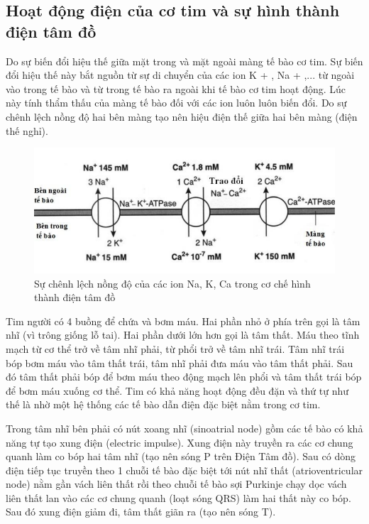 \subsection{Hoạt động điện của cơ tim và sự hình thành điện tâm đồ}
Do sự biến đổi hiệu thế giữa mặt trong và mặt ngoài màng tế bào cơ tim. Sự biến đổi hiệu thế này bắt nguồn từ sự di chuyển của các ion K + , Na + ,... từ ngoài vào trong tế bào và từ trong tế bào ra ngoài khi tế bào cơ tim hoạt động. Lúc này tính thẩm thấu của màng tế bào đối với các ion luôn luôn biến đổi. Do sự chênh lệch nồng độ hai bên màng tạo nên hiệu điện thế giữa hai bên màng (điện thế nghỉ).
\begin{center}
    \begin{figure}[htp]
    \begin{center}
     \includegraphics[scale=.4]{image/week1/h21.png}
    \end{center}
    \caption{Sự chênh lệch nồng độ của các ion Na, K, Ca trong cơ chế hình thành điện tâm đồ \cite{huongdanDTT}}
    \end{figure}
\end{center}\par
Tim người có 4 buồng để chứa và bơm máu. Hai phần nhỏ ở phía trên gọi là tâm nhĩ (vì trông giống lỗ tai). Hai phần dưới lớn hơn gọi là tâm thất. Máu theo tĩnh mạch từ cơ thể trở về tâm nhĩ phải, từ phổi trở về tâm nhĩ trái. Tâm nhĩ trái bóp bơm máu vào tâm thất trái, tâm nhĩ phải đưa máu vào tâm thất phải. Sau đó tâm thất phải bóp để bơm máu theo động mạch lên phổi và tâm thất trái bóp để bơm máu xuống cơ thể. Tim có khả năng hoạt động đều đặn và thứ tự như thế là nhờ một hệ thống các tế bào dẫn điện đặc biệt nằm trong cơ tim.\par
Trong tâm nhĩ bên phải có nút xoang nhĩ (sinoatrial node) gồm các tế bào có khả năng tự tạo xung điện (electric impulse). Xung điện này truyền ra các cơ chung quanh làm co bóp hai tâm nhĩ (tạo nên sóng P trên Điện Tâm đồ). Sau có dòng điện tiếp tục truyền theo 1 chuỗi tế bào đặc biệt tới nút nhĩ thất (atrioventricular node) nằm gần vách liên thất rồi theo chuỗi tế bào sợi Purkinje chạy dọc vách liên thất lan vào các cơ chung quanh (loạt sóng QRS) làm hai thất này co bóp. Sau đó xung điện giảm đi, tâm thất giãn ra (tạo nên sóng T).


